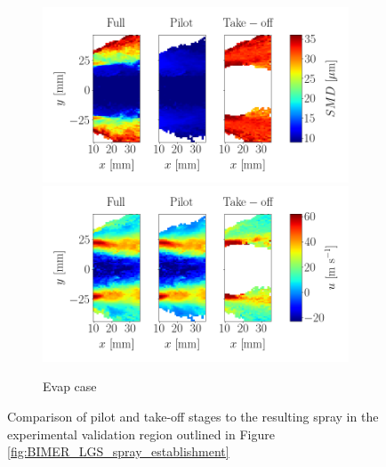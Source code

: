\begin{figure}[h!]
\begin{subfigure}[b]{1.0\textwidth}
	\centering
	\includegraphics[scale=0.5]{./part3_applications/figures_ch9_lagrangian/simus_pilot_takeoff_comparison/evap_SMD.png}
\hspace*{0.1in}
   \includegraphics[scale=0.5]{./part3_applications/figures_ch9_lagrangian/simus_pilot_takeoff_comparison/evap_u_axial.png}
   \vspace*{-0.15in}
   \caption{Evap case}
\end{subfigure}
   \vspace*{-0.2in}
\caption[Comparison of pilot and take-off stages to the resulting
spray ]{Comparison of pilot and take-off stages to the resulting
spray in the experimental validation region outlined in Figure \ref{fig:BIMER_LGS_spray_establishment}}
\label{fig:comparison_pilot_takeoff_maps_BIMER_lgs}
\end{figure}

